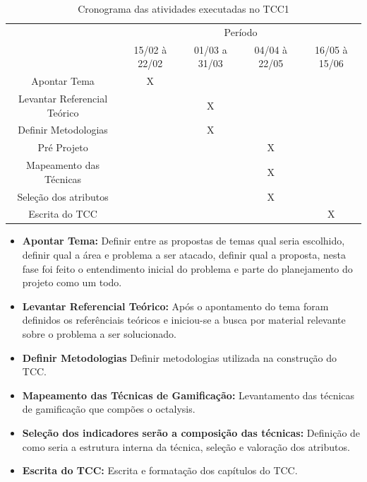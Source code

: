 \begin{table}[!htpb]
\centering

\begin{small} 
  
\setlength{\tabcolsep}{3pt} 


\begin{tabular}{|c|c|c|c|c|}\hline
 & \multicolumn{4}{c|}{Período}\\ \cline{2-5}
\raisebox{1.5ex}{Etapa} & 15/02 à 22/02 & 01/03 a 31/03 & 04/04 à 22/05 & 16/05 à 15/06 \\ \hline

Apontar Tema & X & & & \\ \hline
Levantar Referencial Teórico & & X & & \\ \hline
Definir Metodologias & & X & & \\ \hline
Pré Projeto & & & X & \\ \hline
Mapeamento das Técnicas & & & X &  \\ \hline
Seleção dos atributos & & & X & \\ \hline
Escrita do TCC & & & & X \\ \hline

\end{tabular} 
\end{small}
\caption{Cronograma das atividades executadas no TCC1\label{t_cronograma}
}
\end{table} 

\begin{itemize}
\item  \textbf {Apontar Tema:} Definir entre as propostas de temas qual seria escolhido,  definir qual a área e problema a ser atacado, definir qual a proposta, nesta fase foi feito o entendimento inicial do problema e parte do planejamento do projeto como um todo.
\item  \textbf {Levantar Referencial Teórico:} Após o apontamento do tema foram definidos os referênciais teóricos e iniciou-se a busca por material relevante sobre o problema a ser solucionado.
\item  \textbf {Definir Metodologias} Definir metodologias utilizada na construção do TCC.
\item  \textbf {Mapeamento das Técnicas de Gamificação:} Levantamento das técnicas de gamificação que compões o octalysis.
\item  \textbf {Seleção dos indicadores serão a composição das técnicas:} Definição de como seria a estrutura interna da técnica, seleção e valoração dos atributos.
\item  \textbf{Escrita do TCC:} Escrita e formatação dos capítulos do TCC.
\end{itemize}




